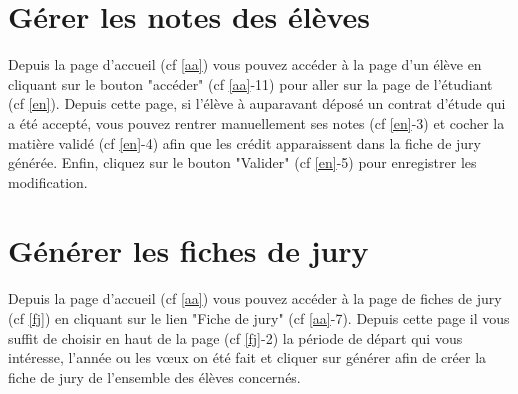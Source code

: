 \section{Gérer les notes des élèves}

Depuis la page d'accueil (cf \ref{aa}) vous pouvez accéder à la page d'un élève en cliquant sur le bouton "accéder" (cf \ref{aa}-11) pour aller sur la page de l'étudiant (cf \ref{en}). Depuis cette page, si l'élève à auparavant déposé un contrat d'étude qui a été accepté, vous pouvez rentrer manuellement ses notes (cf \ref{en}-3) et cocher la matière validé (cf \ref{en}-4) afin que les crédit apparaissent dans la fiche de jury générée. Enfin, cliquez sur le bouton "Valider" (cf \ref{en}-5) pour enregistrer les modification.


\section{Générer les fiches de jury}
\label{fju}
Depuis la page d'accueil (cf \ref{aa}) vous pouvez accéder à la page de fiches de jury (cf \ref{fj}) en cliquant sur le lien "Fiche de jury" (cf \ref{aa}-7). Depuis cette page il vous suffit de choisir en haut de la page (cf \ref{fj}-2) la période de départ qui vous intéresse, l'année ou les vœux on été fait et cliquer sur générer afin de créer la fiche de jury de l'ensemble des élèves concernés. 


